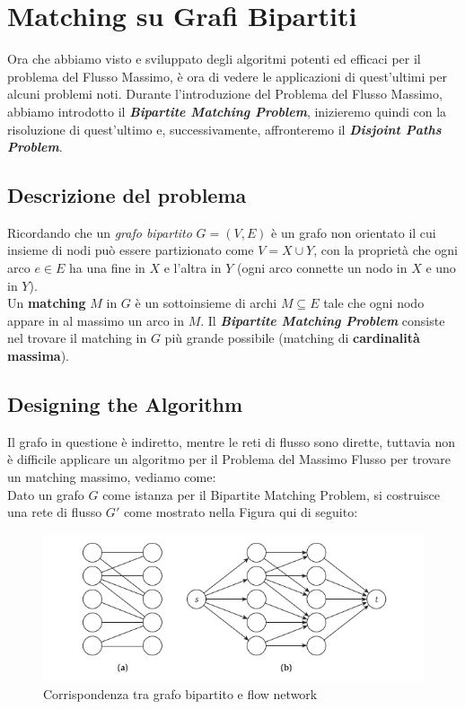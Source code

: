 \chapter{Matching su Grafi Bipartiti}

Ora che abbiamo visto e sviluppato degli algoritmi potenti ed efficaci
per il problema del Flusso Massimo, è ora di vedere le applicazioni di
quest'ultimi per alcuni problemi noti. Durante l'introduzione del
Problema del Flusso Massimo, abbiamo introdotto il
\textbf{\emph{Bipartite Matching Problem}}, inizieremo quindi con la
risoluzione di quest'ultimo e, successivamente, affronteremo il
\textbf{\emph{Disjoint Paths Problem}}.

\section{Descrizione del problema}

Ricordando che un \emph{grafo bipartito} $G = (V, E)$ è un grafo non
orientato il cui insieme di nodi può essere partizionato come
$V = X \cup Y$, con la proprietà che ogni arco $e \in E$ ha una fine
in $X$ e l'altra in $Y$ (ogni arco connette un nodo in $X$ e uno
in $Y$).\\ Un \textbf{matching} $M$ in $G$ è un sottoinsieme di
archi $M \subseteq E$ tale che ogni nodo appare in al massimo un arco
in $M$. Il \textbf{\emph{Bipartite Matching Problem}} consiste nel
trovare il matching in $G$ più grande possibile (matching di
\textbf{cardinalità massima}).

\section{Designing the Algorithm}

Il grafo in questione è indiretto, mentre le reti di flusso sono
dirette, tuttavia non è difficile applicare un algoritmo per il Problema
del Massimo Flusso per trovare un matching massimo, vediamo come:\\

Dato un grafo $G$ come istanza per il Bipartite Matching Problem, si
costruisce una rete di flusso $G'$ come mostrato nella Figura qui di
seguito:\\

\begin{figure}[H]
	\centering
	\includegraphics[width = 12cm]{capitoli/network_flow/imgs/bipartite1.png}
	\caption{Corrispondenza tra grafo bipartito e flow network}
\end{figure}

